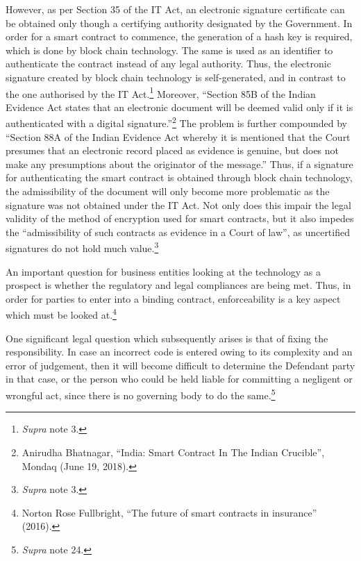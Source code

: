 \begin{multicols}{2}
\noi
However, as per Section 35 of the IT Act, an electronic signature certificate can be obtained
only though a certifying authority designated by the Government. In order for a smart
contract to commence, the generation of a hash key is required, which is done by block chain
technology. The same is used as an identifier to authenticate the contract instead of any legal
authority. Thus, the electronic signature created by block chain technology is self-generated,
and in contrast to the one authorised by the IT Act.\footnote{\textit{Supra} note 3.} Moreover, “Section 85B of the Indian
Evidence Act states that an electronic document will be deemed valid only if it is
authenticated with a digital signature.”\footnote{Anirudha Bhatnagar, “India: Smart Contract In The Indian Crucible”, Mondaq (June 19, 2018). } The problem is further compounded by “Section 88A
of the Indian Evidence Act whereby it is mentioned that the Court presumes that an electronic
record placed as evidence is genuine, but does not make any presumptions about the
originator of the message.” Thus, if a signature for authenticating the smart contract is
obtained through block chain technology, the admissibility of the document will only become
more problematic as the signature was not obtained under the IT Act. Not only does this
impair the legal validity of the method of encryption used for smart contracts, but it also
impedes the “admissibility of such contracts as evidence in a Court of law”, as uncertified
signatures do not hold much value.\footnote{\textit{Supra} note 3.}

\vspace{-.1cm}


\vspace{-.1cm}

\noi
An important question for business entities looking at the technology as a prospect is whether
the regulatory and legal compliances are being met. Thus, in order for parties to enter into a
binding contract, enforceability is a key aspect which must be looked at.\footnote{Norton Rose Fullbright, “The future of smart contracts in insurance” (2016).}

\noi
One significant legal question which subsequently arises is that of fixing the responsibility. In
case an incorrect code is entered owing to its complexity and an error of judgement, then it
will become difficult to determine the Defendant party in that case, or the person who could
be held liable for committing a negligent or wrongful act, since there is no governing body to
do the same.\footnote{\textit{Supra} note 24.}


\end{multicols}
